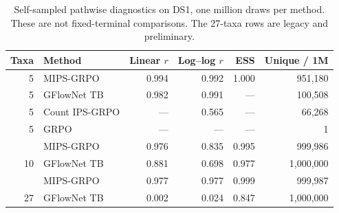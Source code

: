 \begin{table}[htbp]
\centering
\caption{Self-sampled pathwise diagnostics on DS1, one million draws per
method. These are not fixed-terminal comparisons. The 27-taxa rows are legacy
and preliminary.}
\label{tab:phylo-diagnostic}
\begin{tabular}{rlrrrr}
\toprule
Taxa & Method & Linear \(r\) & Log--log \(r\) & ESS & Unique / 1M \\
\midrule
5 & MIPS-GRPO & 0.994 & 0.992 & 1.000 & 951,180 \\
5 & GFlowNet TB & 0.982 & 0.991 & --- & 100,508 \\
5 & Count IPS-GRPO & --- & 0.565 & --- & 66,268 \\
5 & GRPO & --- & --- & --- & 1 \\
\addlinespace
10 & MIPS-GRPO & 0.976 & 0.835 & 0.995 & 999,986 \\
10 & GFlowNet TB & 0.881 & 0.698 & 0.977 & 1,000,000 \\
\addlinespace
27 & MIPS-GRPO & 0.977 & 0.977 & 0.999 & 999,987 \\
27 & GFlowNet TB & 0.002 & 0.024 & 0.847 & 1,000,000 \\
\bottomrule
\end{tabular}
\end{table}


